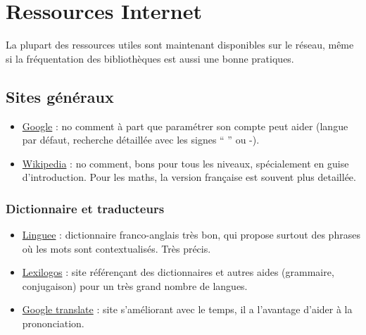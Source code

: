 \documentclass[a4paper,10pt]{book_ad}
\begin{document}
\tableofcontents 
\newpage

\dominitoc


\chapter{Ressources Internet}
\minitoc


La plupart des ressources utiles sont maintenant disponibles sur le réseau,
même si la fréquentation des bibliothèques est aussi une bonne pratiques.


\section{Sites généraux}
\begin{itemize}
 \item \href{www.google.com}{Google} : 
no comment à part que paramétrer son compte
peut aider (langue par défaut, recherche détaillée avec les signes `` '' ou -).

\item \href{http://wikipedia.org/}{Wikipedia} : no comment, 
bons pour tous les niveaux, spécialement en guise d'introduction. Pour les maths,
la version française est souvent plus detaillée.

\end{itemize}




\subsection{Dictionnaire et traducteurs}

\begin{itemize}
\item \href{http://www.linguee.com/}{Linguee} : dictionnaire franco-anglais très bon, qui propose 
surtout des phrases où les mots sont contextualisés. Très précis.
\item \href{http://www.lexilogos.com/}{Lexilogos} : site référençant des dictionnaires et autres
aides (grammaire, conjugaison) pour un très grand nombre de langues. 
\item \href{https://translate.google.fr/}{Google translate} : site s'améliorant avec le temps, il a l'avantage d'aider à la prononciation.
\end{itemize}
\end{document}

